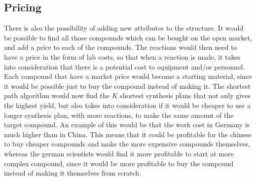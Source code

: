 \documentclass[a4paper,10pt,titlepage]{paper}
\begin{document}
\subsection{Pricing}
There is also the possibility of adding new attributes to the structure. It would be possible to find all those compounds which can be bought on the open market, and add a price to each of the compounds. The reactions would then need to have a price in the form of lab costs, so that when a reaction is made, it takes into consideration that there is a potential cost to equipment and/or personnel.\\
Each compound that have a market price would become a starting material, since it would be possible just to buy the compound instead of making it. The shortest path algorithm would now find the $K$ shortest synthesis plans that not only gives the highest yield, but also takes into consideration if it would be cheaper to use a longer synthesis plan, with more reactions, to make the same amount of the target compound. An example of this would be that the work cost in Germany is much higher than in China. This means that it could be profitable for the chinese to buy cheaper compounds and make the more expensive compounds themselves, whereas the german scientists would find it more profitable to start at more complex compound, since it would be more profitable to buy the compound instead of making it themselves from scratch.
\end{document}
